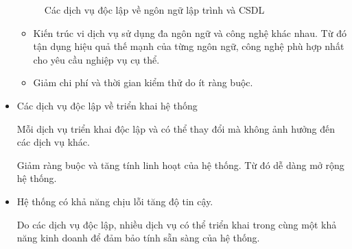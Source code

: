 \begin{itemize}
\begin{figure}[H]
\caption{Các dịch vụ độc lập về ngôn ngữ lập trình và CSDL}

\end{figure}

\begin{itemize}

\item Kiến trúc vi dịch vụ sử dụng đa ngôn ngữ và công nghệ khác nhau. Từ đó tận dụng hiệu quả thế mạnh của từng ngôn ngữ, công nghệ phù hợp nhất cho yêu cầu nghiệp vụ cụ thể.

\item Giảm chi phí và thời gian kiểm thử do ít ràng buộc.

\end{itemize}

\item Các dịch vụ độc lập về triển khai hệ thống

Mỗi dịch vụ triển khai độc lập và có thể thay đổi mà không ảnh hưởng đến các dịch vụ khác.

Giảm ràng buộc và tăng tính linh hoạt của hệ thống. Từ đó dễ dàng mở rộng hệ thống.

\item Hệ thống có khả năng chịu lỗi tăng độ tin cậy.

Do các dịch vụ độc lập, nhiều dịch vụ có thể triển khai trong cùng một khả năng kinh doanh để đảm bảo tính sẵn sàng của hệ thống.

\end{itemize}



